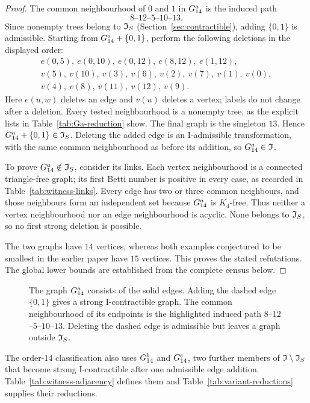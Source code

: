 \begin{proof}
The common neighbourhood of $0$ and $1$ in $G_{14}^{a}$ is the induced path
\[
 8\text{--}12\text{--}5\text{--}10\text{--}13.
\]
Since nonempty trees belong to $\mathfrak I_S$ (Section~\ref{sec:contractible}),
adding $\{0,1\}$ is admissible.
Starting from $G_{14}^{a}+\{0,1\}$, perform the following deletions in the
displayed order:
\[
\begin{gathered}
 e(0,5),\ e(0,10),\ e(0,12),\ e(8,12),\ e(1,12),\\
 v(5),\ v(10),\ v(3),\ v(6),\ v(2),\ v(7),\ v(1),\ v(0),\\
 v(4),\ v(8),\ v(11),\ v(12),\ v(9).
\end{gathered}
\]
Here $e(u,w)$ deletes an edge and $v(u)$ deletes a vertex; labels do
not change after a deletion. Every tested neighbourhood is a nonempty
tree, as the explicit lists in Table~\ref{tab:Ga-reduction} show.
The final graph is the singleton $13$. Hence $G_{14}^{a}+\{0,1\}\in\mathfrak I_S$.
Deleting the added edge is an I-admissible transformation, with the
same common neighbourhood as before its addition, so $G_{14}^{a}\in\mathfrak I$.

To prove $G_{14}^{a}\notin\mathfrak I_S$, consider its links. Each vertex neighbourhood
is a connected triangle-free graph; its first Betti number is positive
in every case, as recorded in Table~\ref{tab:witness-links}.
Every edge has two or three common neighbours, and those neighbours
form an independent set because $G_{14}^{a}$ is $K_4$-free.
Thus neither a vertex neighbourhood nor an edge neighbourhood is
acyclic. None belongs to $\mathfrak I_S$, so no first strong deletion is possible.

The two graphs have $14$ vertices, whereas both examples conjectured
to be smallest in the earlier paper have $15$ vertices. This proves
the stated refutations. The global lower bounds are established from
the complete census below.
\end{proof}

\begin{figure}[tbp]
\centering

\caption{The graph $G_{14}^{a}$ consists of the solid edges. Adding the dashed
edge $\{0,1\}$ gives a strong I-contractible graph. The common
neighbourhood of its endpoints is the highlighted induced path
$8$--$12$--$5$--$10$--$13$. Deleting the dashed edge is admissible but
leaves a graph outside $\mathfrak I_S$.}\label{fig:G14}
\end{figure}

The order-$14$ classification also uses $G_{14}^{b}$ and $G_{14}^{c}$, two further
members of $\mathfrak I\setminus\mathfrak I_S$ that become strong I-contractible after
one admissible edge addition. Table~\ref{tab:witness-adjacency} defines
them and Table~\ref{tab:variant-reductions} supplies their reductions.

